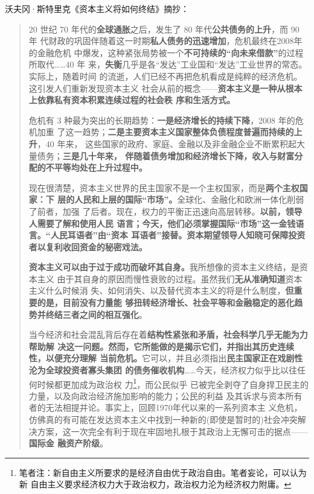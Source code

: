 沃夫冈·斯特里克《资本主义将如何终结》\cite{JJDK201504024}\cite{streeck2017will}摘抄：
\begin{quotation}
  20 世纪 70 年代的\textbf{全球通胀}之后，发生了 80 年代\textbf{公共债务的上升}，而 90 年
  代财政的巩固伴随着这一时期\textbf{私人债务的迅速增加}，危机最终在2008年的金融危机
  中爆发，这种紧张局势被一个\textbf{不可持续的“向未来借款”}的过程所取代……40 年
  来，\textbf{失衡}几乎是各“发达”工业国和“发达”工业世界的常态。实际上，随着时间
  的流逝，人们已经不再把危机看成是纯粹的经济危机。这引发人们重新发现资本主义
  社会从前的概念——\textbf{资本主义是一种从根本上依靠私有资本积累连续过程的社会秩
    序和生活方式。}

  危机有 3 种最为突出的长期趋势：\textbf{一是经济增长的持续下降}，2008 年的危机加重
  了这一趋势；\textbf{二是主要资本主义国家整体负债程度普遍而持续的上升}，40 年来，
  这些国家的政府、家庭、金融以及非金融企业不断累积起大量债务；\textbf{三是几十年来，
    伴随着债务增加和经济增长下降，收入与财富分配的不平等均处在上升过程中。}

  现在很清楚，资本主义世界的民主国家不是一个主权国家，而是\textbf{两个主权国家：下
    层的人民和上层的国际“市场”。}全球化、金融化和欧洲一体化削弱了前者，加强
  了后者。现在，权力的平衡正迅速向高层转移。\textbf{以前，领导人需要了解和使用人民
    语言；今天，他们必须掌握国际“市场”这一金钱语言。“人民耳语者”由“资本
    耳语者”接替。资本期望领导人知晓可保障投资者以复利收回资金的秘密戏法。}

  \textbf{资本主义可以由于过于成功而破坏其自身。}我所想像的资本主义终结，是资本主义
  由于其自身的原因而慢性衰败的过程。虽然我们\textbf{无从准确知道}资本主义什么时候消
  失、如何消失、以及替代资本主义的将是什么制度，\textbf{但重要的是，目前没有力量能
    够扭转经济增长、社会平等和金融稳定的恶化趋势并终结三者之间的相互强化}。

  当今经济和社会混乱背后存在着\textbf{结构性紧张和矛盾，社会科学几乎无能为力帮助解
    决这一问题。然而，它所能做的是揭示它们，并指出其历史连续性，以便充分理解
    当前危机。}它可以，并且必须指出\textbf{民主国家正在戏剧性沦为全球投资者寡头集团
    的债务催收机构}……今天，经济权力似乎比以往任何时候都更加成为政治权
  力\footnote{笔者注：新自由主义所要求的是经济自由优于政治自由。笔者妄论，可以认为新
    自由主义要求经济权力大于政治权力，政治权力沦为经济权力附庸。}，而公民似乎
  已被完全剥夺了自身捍卫民主的力量，以及向政治经济施加影响的能力；公民的利益
  及其诉求与资本所有者的无法相提并论。事实上，回顾1970年代以来的一系列资本主
  义危机，仿佛真的有可能在发达资本主义中找到一种新的(即使是暂时的)社会冲突解
  决方案，这一次完全有利于现在牢固地扎根于其政治上无懈可击的据点——\textbf{国际金
    融资产阶级}。
\end{quotation}

